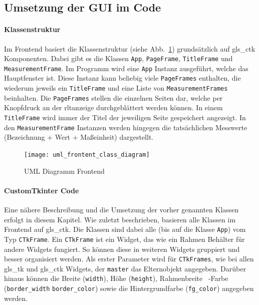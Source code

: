 \subsection{Umsetzung der GUI im Code}\label{tkintercode}
\paragraph{Klassenstruktur}
Im Frontend basiert die Klassenstruktur (siehe Abb.~\ref{fig:klassenstruktur_frontend}) grundsätzlich auf \gls{gls_ctk} Komponenten. Dabei gibt es die Klassen \lstinline{App}, \lstinline{PageFrame}, \lstinline{TitleFrame} und \lstinline{MeasurementFrame}. Im Programm wird eine \lstinline{App} Instanz ausgeführt, welche das Hauptfenster ist. Diese Instanz kann beliebig viele \lstinline{PageFrames} enthalten, die wiederum jeweils ein \lstinline{TitleFrame} und eine Liste von \lstinline{MeasurementFrames} beinhalten. Die \lstinline{PageFrames} stellen die einzelnen Seiten dar, welche per Knopfdruck an der \acs{rltanzeige} durchgeblättert werden können. In einem \lstinline{TitleFrame} wird immer der Titel der jeweiligen Seite gespeichert \bzw angezeigt. In den \lstinline{MeasurementFrame} Instanzen werden hingegen die tatsächlichen Messwerte (Bezeichnung + Wert + Maßeinheit) dargestellt.

\begin{figure}[H]
	\centering
	\texttt{[image: uml\_frontent\_class\_diagram]}
	\caption{UML Diagramm Frontend \label{fig:klassenstruktur_frontend}}
\end{figure}

\paragraph{CustomTkinter Code}

Eine nähere Beschreibung und die Umsetzung der vorher genannten Klassen erfolgt in diesem Kapitel. 
\newline Wie zuletzt beschrieben, basieren alle Klassen im Frontend auf \gls{gls_ctk}. Die Klassen sind dabei alle (bis auf die Klasse \lstinline{App}) vom Typ \lstinline{CTkFrame}. Ein \lstinline{CTkFrame} ist ein Widget, das wie ein Rahmen \bzw Behälter für andere Widgets fungiert. So können diese in weiteren Widgets gruppiert und besser organisiert werden. Als erster Parameter wird für \lstinline{CTkFrames}, wie bei allen \gls{gls_tk} und \gls{gls_ctk} Widgets, der \lstinline{master} \bzw das Elternobjekt angegeben. Darüber hinaus können die Breite (\lstinline{width}), Höhe (\lstinline{height}), Rahmenbreite \bzw \ -Farbe (\lstinline{border_width} \bzw \lstinline{border_color}) sowie die Hintergrundfarbe (\lstinline{fg_color}) angegeben werden. \cite[vgl.][]{Schimansky:o.J.}

